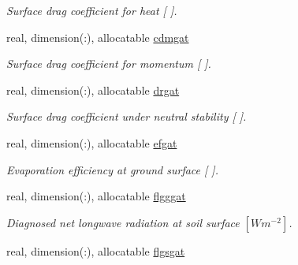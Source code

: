 \begin{DoxyCompactItemize}
\begin{DoxyCompactList}\small\item\em Surface drag coefficient for heat \mbox{[} \mbox{]}. \end{DoxyCompactList}\item 
\hypertarget{structclass__statevars_1_1class__gather_adbe2ef25d475d88efcf7965f686324c2}{}real, dimension(\+:), allocatable \hyperlink{structclass__statevars_1_1class__gather_adbe2ef25d475d88efcf7965f686324c2}{cdmgat}\label{structclass__statevars_1_1class__gather_adbe2ef25d475d88efcf7965f686324c2}

\begin{DoxyCompactList}\small\item\em Surface drag coefficient for momentum \mbox{[} \mbox{]}. \end{DoxyCompactList}\item 
\hypertarget{structclass__statevars_1_1class__gather_ae8abd6b84352019c50b8d2f28e8ceb90}{}real, dimension(\+:), allocatable \hyperlink{structclass__statevars_1_1class__gather_ae8abd6b84352019c50b8d2f28e8ceb90}{drgat}\label{structclass__statevars_1_1class__gather_ae8abd6b84352019c50b8d2f28e8ceb90}

\begin{DoxyCompactList}\small\item\em Surface drag coefficient under neutral stability \mbox{[} \mbox{]}. \end{DoxyCompactList}\item 
\hypertarget{structclass__statevars_1_1class__gather_ad0c7f9c1c7917876e955cd15840e8e6f}{}real, dimension(\+:), allocatable \hyperlink{structclass__statevars_1_1class__gather_ad0c7f9c1c7917876e955cd15840e8e6f}{efgat}\label{structclass__statevars_1_1class__gather_ad0c7f9c1c7917876e955cd15840e8e6f}

\begin{DoxyCompactList}\small\item\em Evaporation efficiency at ground surface \mbox{[} \mbox{]}. \end{DoxyCompactList}\item 
\hypertarget{structclass__statevars_1_1class__gather_a952e27952849da658646416e2f0418b5}{}real, dimension(\+:), allocatable \hyperlink{structclass__statevars_1_1class__gather_a952e27952849da658646416e2f0418b5}{flgggat}\label{structclass__statevars_1_1class__gather_a952e27952849da658646416e2f0418b5}

\begin{DoxyCompactList}\small\item\em Diagnosed net longwave radiation at soil surface $[W m^{-2} ]$. \end{DoxyCompactList}\item 
\hypertarget{structclass__statevars_1_1class__gather_ad75e891deaf0e0931df4da4b3544e5f3}{}real, dimension(\+:), allocatable \hyperlink{structclass__statevars_1_1class__gather_ad75e891deaf0e0931df4da4b3544e5f3}{flgsgat}\label{structclass__statevars_1_1class__gather_ad75e891deaf0e0931df4da4b3544e5f3}


\end{DoxyCompactItemize}
